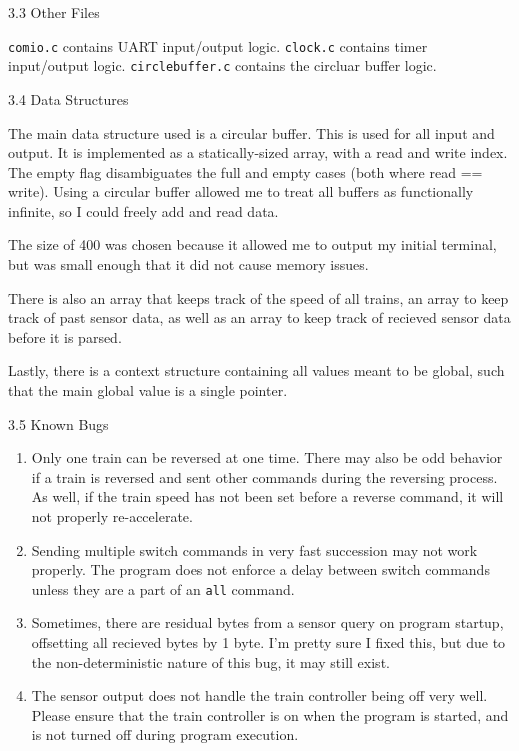 \documentclass{article}
\begin{document}
{\large 3.3 Other Files}

\verb|comio.c| contains UART input/output logic. \verb|clock.c| contains timer input/output logic. \verb|circlebuffer.c| contains the circluar buffer logic.

{\large 3.4 Data Structures}

The main data structure used is a circular buffer. This is used for all input and output. It is implemented as a statically-sized array, with a read and write index. The empty flag disambiguates the full and empty cases (both where read == write). Using a circular buffer allowed me to treat all buffers as functionally infinite, so I could freely add and read data.

The size of 400 was chosen because it allowed me to output my initial terminal, but was small enough that it did not cause memory issues.

There is also an array that keeps track of the speed of all trains, an array to keep track of past sensor data, as well as an array to keep track of recieved sensor data before it is parsed.

Lastly, there is a context structure containing all values meant to be global, such that the main global value is a single pointer.

{\large 3.5 Known Bugs}

\begin{enumerate}
\item Only one train can be reversed at one time. There may also be odd behavior if a train is reversed and sent other commands during the reversing process. As well, if the train speed has not been set before a reverse command, it will not properly re-accelerate.
\item Sending multiple switch commands in very fast succession may not work properly. The program does not enforce a delay between switch commands unless they are a part of an \verb|all| command.
\item Sometimes, there are residual bytes from a sensor query on program startup, offsetting all recieved bytes by 1 byte. I'm pretty sure I fixed this, but due to the non-deterministic nature of this bug, it may still exist.
\item The sensor output does not handle the train controller being off very well. Please ensure that the train controller is on when the program is started, and is not turned off during program execution.
\end{enumerate}
\end{document}
